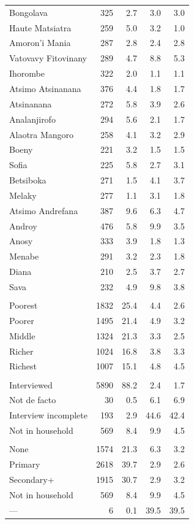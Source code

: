\documentclass[11pt,a4paper]{article}
\begin{document}
\begin{longtable}{l|rrrr}
Bongolava & 325 & 2.7 & 3.0 & 3.0 \\ 
Haute Matsiatra & 259 & 5.0 & 3.2 & 1.0 \\ 
Amoron'i Mania & 287 & 2.8 & 2.4 & 2.8 \\ 
Vatovavy Fitovinany & 289 & 4.7 & 8.8 & 5.3 \\ 
Ihorombe & 322 & 2.0 & 1.1 & 1.1 \\ 
Atsimo Atsinanana & 376 & 4.4 & 1.8 & 1.7 \\ 
Atsinanana & 272 & 5.8 & 3.9 & 2.6 \\ 
Analanjirofo & 294 & 5.6 & 2.1 & 1.7 \\ 
Alaotra Mangoro & 258 & 4.1 & 3.2 & 2.9 \\ 
Boeny & 221 & 3.2 & 1.5 & 1.5 \\ 
Sofia & 225 & 5.8 & 2.7 & 3.1 \\ 
Betsiboka & 271 & 1.5 & 4.1 & 3.7 \\ 
Melaky & 277 & 1.1 & 3.1 & 1.8 \\ 
Atsimo Andrefana & 387 & 9.6 & 6.3 & 4.7 \\ 
Androy & 476 & 5.8 & 9.9 & 3.5 \\ 
Anosy & 333 & 3.9 & 1.8 & 1.3 \\ 
Menabe & 291 & 3.2 & 2.3 & 1.8 \\ 
Diana & 210 & 2.5 & 3.7 & 2.7 \\ 
Sava & 232 & 4.9 & 9.8 & 3.8 \\ 
\midrule\addlinespace[2.5pt]
\multicolumn{5}{l}{Wealth quintile} \\[2.5pt] 
\midrule\addlinespace[2.5pt]
Poorest & 1832 & 25.4 & 4.4 & 2.6 \\ 
Poorer & 1495 & 21.4 & 4.9 & 3.2 \\ 
Middle & 1324 & 21.3 & 3.3 & 2.5 \\ 
Richer & 1024 & 16.8 & 3.8 & 3.3 \\ 
Richest & 1007 & 15.1 & 4.8 & 4.5 \\ 
\midrule\addlinespace[2.5pt]
\multicolumn{5}{l}{Mother's interview status} \\[2.5pt] 
\midrule\addlinespace[2.5pt]
Interviewed & 5890 & 88.2 & 2.4 & 1.7 \\ 
Not de facto & 30 & 0.5 & 6.1 & 6.9 \\ 
Interview incomplete & 193 & 2.9 & 44.6 & 42.4 \\ 
Not in household & 569 & 8.4 & 9.9 & 4.5 \\ 
\midrule\addlinespace[2.5pt]
\multicolumn{5}{l}{Mother's education} \\[2.5pt] 
\midrule\addlinespace[2.5pt]
None & 1574 & 21.3 & 6.3 & 3.2 \\ 
Primary & 2618 & 39.7 & 2.9 & 2.6 \\ 
Secondary+ & 1915 & 30.7 & 2.9 & 3.2 \\ 
Not in household & 569 & 8.4 & 9.9 & 4.5 \\ 
— & 6 & 0.1 & 39.5 & 39.5 \\ 
\bottomrule
\end{longtable}
\end{document}
